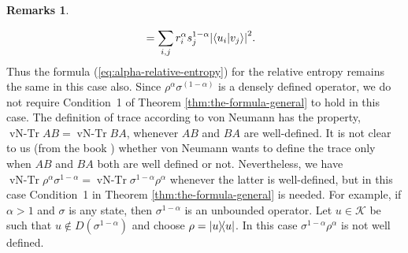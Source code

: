 \documentclass[12pt,a4paper,oneside]{article}
\numberwithin{equation}{section}
\theoremstyle{definition}  %
\newtheorem{rmks}[defn]{Remarks}
\theoremstyle{plain}  %
\theoremstyle{remark} %
\newcommand{\CK}{\mathcal{K}}
\begin{document}
\begin{rmks}
\begin{enumerate}
\begin{align*}
   & = \sum\limits_{i,j}r_i^{\alpha}s_j^{1-\alpha}\abs{\braket{u_i}{v_j}}^2.
   \end{align*}
    Thus the
   formula (\ref{eq:alpha-relative-entropy})  for the relative
   entropy remains the same in this case also. Since $\rho^{\alpha}\sigma^{(1-\alpha)}$ is a densely defined operator, we do not require Condition~1 of Theorem \ref{thm:the-formula-general} to hold in this case. The definition of trace according to von Neumann has the property, $\operatorname{vN-Tr} AB = \operatorname{vN-Tr} BA$, whenever $AB$ and $BA$ are well-defined. It is not clear to us (from the book \cite{vN2018}) whether von Neumann wants to define the trace only when  $AB$ and $BA$  both are well defined or not. Nevertheless, we have $ \operatorname{vN-Tr} \rho^{\alpha}\sigma^{1-\alpha} = \operatorname{vN-Tr} \sigma^{1-\alpha}\rho^{\alpha}$ whenever the latter  is well-defined, but in this case Condition~1  in Theorem \ref{thm:the-formula-general} is needed. For example, if $\alpha>1$ and $\sigma$ is any state, then 
   $\sigma^{1-\alpha}$ is an unbounded operator. Let $u\in \CK$ be such that $u\notin D(\sigma^{1-\alpha})$ and choose $\rho = \ketbra{u}$. In this case $\sigma^{1-\alpha}\rho^\alpha$ is not well defined.
   \end{enumerate}
 \end{rmks}
 
\end{document}
